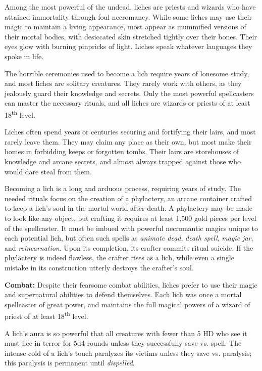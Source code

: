 \begin{multicols}{2}
\begin{minipage}{\columnwidth}
\end{minipage}

Among the most powerful of the undead, liches are priests and wizards who have attained immortality through foul necromancy. While some liches may use their magic to maintain a living appearance, most appear as mummified versions of their mortal bodies, with desiccated skin stretched tightly over their bones. Their eyes glow with burning pinpricks of light. Liches speak whatever languages they spoke in life.

The horrible ceremonies used to become a lich require years of lonesome study, and most liches are solitary creatures. They rarely work with others, as they jealously guard their knowledge and secrets. Only the most powerful spellcasters can master the necessary rituals, and all liches are wizards or priests of at least 18\textsuperscript{th} level.

Liches often spend years or centuries securing and fortifying their lairs, and most rarely leave them. They may claim any place as their own, but most make their homes in forbidding keeps or forgotten tombs. Their lairs are storehouses of knowledge and arcane secrets, and almost always trapped against those who would dare steal from them.

Becoming a lich is a long and arduous process, requiring years of study. The needed rituals focus on the creation of a phylactery, an arcane container crafted to keep a lich's soul in the mortal world after death. A phylactery may be made to look like any object, but crafting it requires at least 1,500 gold pieces per level of the spellcaster. It must be imbued with powerful necromantic magics unique to each potential lich, but often such spells as \textit{animate dead}, \textit{death spell}, \textit{magic jar}, and \textit{reincarnation}. Upon its completion, its crafter commits ritual suicide. If the phylactery is indeed flawless, the crafter rises as a lich, while even a single mistake in its construction utterly destroys the crafter's soul.

\textbf{Combat:} Despite their fearsome combat abilities, liches prefer to use their magic and supernatural abilities to defend themselves. Each lich was once a mortal spellcaster of great power, and maintains the full magical powers of a wizard of priest of at least 18\textsuperscript{th} level.

A lich's aura is so powerful that all creatures with fewer than 5 HD who see it must flee in terror for 5d4 rounds unless they successfully save vs. spell. The intense cold of a lich's touch paralyzes its victims unless they save vs. paralysis; this paralysis is permanent until \textit{dispelled}.


\end{multicols}
